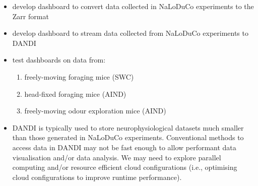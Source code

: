 \begin{itemize}

    \item develop dashboard to convert data collected in NaLoDuCo experiments
    to the Zarr format

    \item develop dashboard to stream data collected from NaLoDuCo experiments
    to DANDI

    \item test dashboards on data from:

    \begin{enumerate}

        \item freely-moving foraging mice (SWC)

        \item head-fixed foraging mice (AIND)

        \item freely-moving odour exploration mice (AIND)

    \end{enumerate}

    \item DANDI is typically used to store neurophysiological datasets much
    smaller than those generated in NaLoDuCo experiments. Conventional methods
    to access data in DANDI may not be fast enough to allow performant data
    visualisation and/or data analysis. We may need to explore parallel
    computing and/or resource efficient cloud configurations (i.e., optimising
    cloud configurations to improve runtime performance).

\end{itemize}

